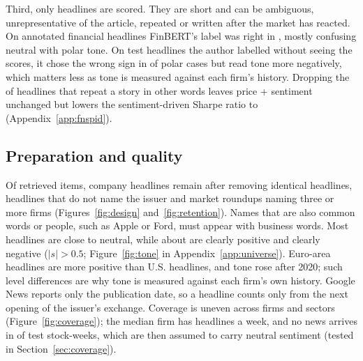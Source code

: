Third, only headlines are scored. They are short and can be ambiguous, unrepresentative of the article, repeated or written after the market has reacted. On \FbHeadlines{} annotated financial headlines FinBERT's label was right in \FbAccuracy{}, mostly confusing neutral with polar tone. On \ManualN{} test headlines the author labelled without seeing the scores, it chose the wrong sign in \ManualOpposite{} of \ManualPolar{} polar cases but read tone more negatively, which matters less as tone is measured against each firm's history. Dropping the \RepShare{} of headlines that repeat a story in other words leaves price + sentiment unchanged but lowers the sentiment-driven Sharpe ratio to \RepSentSharpe{} (Appendix~\ref{app:fnspid}).

\subsection{Preparation and quality}\label{sec:prep}
Of \Retrieved{} retrieved items, \Headlines{} company headlines remain after removing identical headlines, headlines that do not name the issuer and market roundups naming three or more firms (Figures~\ref{fig:design} and~\ref{fig:retention}). Names that are also common words or people, such as Apple or Ford, must appear with business words.
Most headlines are close to neutral, while about \TonePositiveShare{} are clearly positive and \ToneNegativeShare{} clearly negative ($|s|>0.5$; Figure~\ref{fig:tone} in Appendix~\ref{app:universe}). Euro-area headlines are more positive than U.S. headlines, and tone rose after 2020; such level differences are why tone is measured against each firm's own history.
Google News reports only the publication date, so a headline counts only from the next opening of the issuer's exchange. Coverage is uneven across firms and sectors (Figure~\ref{fig:coverage}); the median firm has \MedianHeadlinesWeek{} headlines a week, and no news arrives in \NoNewsShare{} of test stock-weeks, which are then assumed to carry neutral sentiment (tested in Section~\ref{sec:coverage}).
